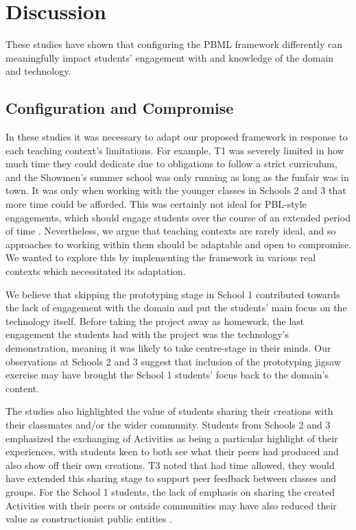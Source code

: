 \section{Discussion}
These studies have shown that configuring the PBML framework differently can meaningfully impact students' engagement with and knowledge of the domain and technology.

\subsection{Configuration and Compromise}
In these studies it was necessary to adapt our proposed framework in response to each teaching context's limitations. For example, T1 was severely limited in how much time they could dedicate due to obligations to follow a strict curriculum, and the Showmen's summer school was only running as long as the funfair was in town. It was only when working with the younger classes in Schools 2 and 3 that more time could be afforded. This was certainly not ideal for PBL-style engagements, which should engage students over the course of an extended period of time \cite{Blumenfeld1991}. Nevertheless, we argue that teaching contexts are rarely ideal, and so approaches to working within them should be adaptable and open to compromise. We wanted to explore this by implementing the framework in various real contexts which necessitated its adaptation.

We believe that skipping the prototyping stage in School 1 contributed towards the lack of engagement with the domain and put the students' main focus on the technology itself. Before taking the project away as homework, the last engagement the students had with the project was the technology's demonstration, meaning it was likely to take centre-stage in their minds. Our observations at Schools 2 and 3 suggest that inclusion of the prototyping jigsaw exercise may have brought the School 1 students' focus back to the domain's content.

The studies also highlighted the value of students sharing their creations with their classmates and/or the wider community. Students from Schools 2 and 3 emphasized the exchanging of Activities as being a particular highlight of their experiences, with students keen to both see what their peers had produced and also show off their own creations. T3 noted that had time allowed, they would have extended this sharing stage to support peer feedback between classes and groups. For the School 1 students, the lack of emphasis on sharing the created Activities with their peers or outside communities may have also reduced their value as constructionist public entities \cite{PapertSeymourandHarel1991a}.

